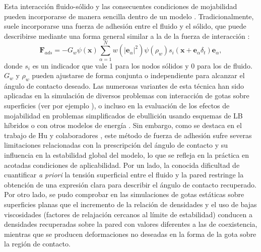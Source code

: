 Esta interacci\'on fluido-s\'olido y las consecuentes condiciones de mojabilidad pueden incorporarse de manera sencilla dentro de un modelo \pp{}. Tradicionalmente, suele incorporarse una fuerza de adhesi\'on entre el fluido y el s\'olido, que puede describirse mediante una forma general similar a la de la fuerza de interacci\'on \cite{chen_critical_2014}:
\begin{equation}
	\bm{F}_{ads}= -G_w \psi(\bm{x}) \sum_{\alpha=1}^{N} w(|\bm{e}_{\alpha}|^2)\psi(\rho_w) s_i(\bm{x}+\bm{e}_{\alpha}\delta_t)\bm{e}_{\alpha},
\end{equation}
donde $s_i$ es un indicador que vale 1 para los nodos s\'olidos y 0 para los de fluido. $G_w$ y $\rho_w$ pueden ajustarse de forma conjunta o independiente para alcanzar el \'angulo de contacto deseado. Las numerosas variantes de esta t\'ecnica han sido aplicadas en la simulaci\'on de diversos problemas con interacci\'on de gotas sobre superficies (ver por ejemplo \cite{li_contact_2014, sbragaglia_surface_2006, xu_three-dimensional_2015}), o incluso en la evaluaci\'on de los efectos de mojabilidad en problemas simplificados de ebullici\'on usando esquemas de LB h\'ibridos o con otros modelos de energ\'ia \cite{li_lattice_2016, ma_numerical_2019, guo_3d_2019}. Sin embargo, como se destaca en el trabajo de Hu y colaboradores \cite{hu_contact_2016}, este m\'etodo de fuerza de adhesi\'on sufre severas limitaciones relacionadas con la prescripci\'on del \'angulo de contacto y su influencia en la estabilidad global del modelo, lo que se refleja en la pr\'actica en acotadas condiciones de aplicabilidad. Por un lado, la conocida dificultad de cuantificar \emph{a priori} la tensi\'on superficial entre el fluido y la pared restringe la obtenci\'on de una expresi\'on clara para describir el \'angulo de contacto recuperado. Por otro lado, se pudo comprobar en las simulaciones de gotas est\'aticas sobre superficies planas que el incremento de la relaci\'on de densidades y el uso de bajas viscosidades (factores de relajaci\'on cercanos al l\'imite de estabilidad) conducen a densidades recuperadas sobre la pared con valores diferentes a las de coexistencia, mientras que se producen deformaciones no deseadas en la forma de la gota sobre la regi\'on de contacto.

